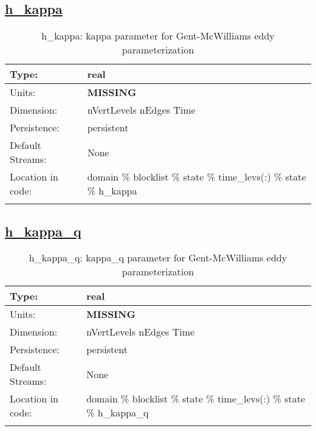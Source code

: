 \subsection[h\_kappa]{\hyperref[sec:var_tab_state]{h\_kappa}}
\label{subsec:var_sec_state_h_kappa}
\begin{center}
\begin{longtable}{| p{2.0in} | p{4.0in} |}
        \hline 
        Type: & real \\
        \hline 
        Units: & {\bf \color{red} MISSING} \\
        \hline 
        Dimension: & nVertLevels nEdges Time \\
        \hline 
        Persistence: & persistent \\
        \hline 
		 Default Streams: & None \\
        \hline 
		 Location in code: & domain \% blocklist \% state \% time\_levs(:) \% state \% h\_kappa \\
		 \hline 
    \caption{h\_kappa: kappa parameter for Gent-McWilliams eddy parameterization}
\end{longtable}
\end{center}
\subsection[h\_kappa\_q]{\hyperref[sec:var_tab_state]{h\_kappa\_q}}
\label{subsec:var_sec_state_h_kappa_q}
\begin{center}
\begin{longtable}{| p{2.0in} | p{4.0in} |}
        \hline 
        Type: & real \\
        \hline 
        Units: & {\bf \color{red} MISSING} \\
        \hline 
        Dimension: & nVertLevels nEdges Time \\
        \hline 
        Persistence: & persistent \\
        \hline 
		 Default Streams: & None \\
        \hline 
		 Location in code: & domain \% blocklist \% state \% time\_levs(:) \% state \% h\_kappa\_q \\
		 \hline 
    \caption{h\_kappa\_q: kappa\_q parameter for Gent-McWilliams eddy parameterization}
\end{longtable}
\end{center}
